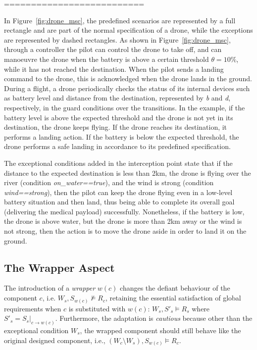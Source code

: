 ==========================

In Figure~\ref{fig:drone_msc}, the predefined scenarios are represented by a full rectangle and are part of the normal specification of a drone, while the exceptions are represented by dashed rectangles. As shown in Figure~\ref{fig:drone_msc}, through a controller the pilot can control the drone to take off, and can manoeuvre the drone when the battery is above a certain threshold $\theta = 10\%$, while it has not reached the destination. When the pilot sends a landing command to the drone, this is acknowledged when the drone lands in the ground.  During a flight, a drone periodically checks the status of its internal devices such as battery level and distance from the destination, represented by \textit{b} and \textit{d}, respectively, in the guard conditions over the transitions. In the example, if the battery level is above the expected threshold and the drone is not yet in its destination, the drone keeps flying. If the drone reaches its destination, it performs a landing action. If the battery is below the expected threshold, the drone performs a safe landing in accordance to its predefined specification. 

The exceptional conditions added in the interception point state that if the distance to the expected destination is less than 2km, the drone is flying over the river (condition \textit{on\_water==true}), and the wind is strong (condition \textit{wind==strong}), then the pilot can keep the drone flying even in a low-level battery situation and then land, thus being able to complete its overall goal (delivering the medical payload) successfully. Nonetheless, if the battery is low, the drone is above water, but the drone is more than 2km away or the wind is not strong,
then the action is to move the drone aside in order to land it on the ground. 


\subsection{The Wrapper Aspect}
The introduction of a {\it wrapper} $w(c)$ changes the defiant behaviour of the component $c$, i.e. $W_s, S_{w(c)} \not \models R_c$, retaining the essential satisfaction of global requirements when $c$ is substituted with $w(c)$:  $W_s, S'_s \models R_s$ where $S'_s = S_s |_{c \rightarrow w(c)}$. Furthermore, the adaptation is {\it cautious} because other than the exceptional condition $W_s$, the wrapped component should still behave like the original designed component, i.e., $(W_c \setminus W_s), S_{w(c)} \models R_c$. 

